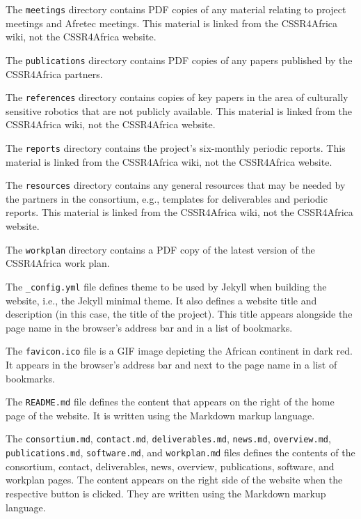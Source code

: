 \documentclass{CSSRforAfrica}
\begin{document}
The   {\small \texttt{meetings}} directory contains PDF copies of any material relating to project meetings and Afretec meetings.  This material is linked from the CSSR4Africa wiki, not the CSSR4Africa website.

The   {\small \texttt{publications}} directory contains PDF copies of any papers published by the CSSR4Africa partners.

The   {\small \texttt{references}} directory contains copies of key papers in the area of culturally sensitive robotics  that are not publicly available. This material is linked from the CSSR4Africa wiki, not the CSSR4Africa website.

The   {\small \texttt{reports}} directory contains the project's six-monthly periodic reports. This material is linked from the CSSR4Africa wiki, not the CSSR4Africa website.

The   {\small \texttt{resources}} directory contains any general resources that may be needed by the partners in the consortium, e.g., templates for deliverables and periodic reports. This material is linked from the CSSR4Africa wiki, not the CSSR4Africa website.

The   {\small \texttt{workplan}} directory contains a PDF copy of the latest version of the CSSR4Africa work plan.  

The   {\small \texttt{\_config.yml}} file defines theme to be used by Jekyll when building the website, i.e., the Jekyll minimal theme. It also defines a website title and description (in this case, the title of the project). This title appears alongside the page name in the browser's address bar and in a list of bookmarks.

The   {\small \texttt{favicon.ico}} file is a GIF image depicting the African continent in dark red. It appears in the browser's address bar and next to the page name in a list of bookmarks.

The   {\small \texttt{README.md}} file defines the content that appears on the right of the home page of the website. It is written using the Markdown markup language.

The {\small \texttt{consortium.md}}, {\small \texttt{contact.md}},  {\small \texttt{deliverables.md}},  {\small \texttt{news.md}},  {\small \texttt{overview.md}}, \\ {\small \texttt{publications.md}},  {\small \texttt{software.md}}, and {\small \texttt{workplan.md}}  files defines the contents of the consortium, contact, deliverables, news, overview, publications, software, and workplan pages. The content appears on the right side of the website when the respective button is clicked. They are written using the Markdown markup language.
\end{document}
